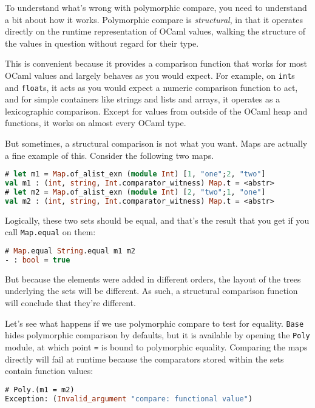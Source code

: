 To understand what's wrong with polymorphic compare, you need to
understand a bit about how it works. Polymorphic compare is
\emph{structural}, in that it operates directly on the runtime
representation of OCaml values, walking the structure of the values in
question without regard for their type.

This is convenient because it provides a comparison function that works
for most OCaml values and largely behaves as you would expect. For
example, on \passthrough{\lstinline!int!}s and
\passthrough{\lstinline!float!}s, it acts as you would expect a numeric
comparison function to act, and for simple containers like strings and
lists and arrays, it operates as a lexicographic comparison. Except for
values from outside of the OCaml heap and functions, it works on almost
every OCaml type.

But sometimes, a structural comparison is not what you want. Maps are
actually a fine example of this. Consider the following two maps.

\begin{lstlisting}[language=Caml]
# let m1 = Map.of_alist_exn (module Int) [1, "one";2, "two"]
val m1 : (int, string, Int.comparator_witness) Map.t = <abstr>
# let m2 = Map.of_alist_exn (module Int) [2, "two";1, "one"]
val m2 : (int, string, Int.comparator_witness) Map.t = <abstr>
\end{lstlisting}

Logically, these two sets should be equal, and that's the result that
you get if you call \passthrough{\lstinline!Map.equal!} on them:

\begin{lstlisting}[language=Caml]
# Map.equal String.equal m1 m2
- : bool = true
\end{lstlisting}

But because the elements were added in different orders, the layout of
the trees underlying the sets will be different. As such, a structural
comparison function will conclude that they're different.

Let's see what happens if we use polymorphic compare to test for
equality. \passthrough{\lstinline!Base!} hides polymorphic comparison by
defaults, but it is available by opening the
\passthrough{\lstinline!Poly!} module, at which point
\passthrough{\lstinline!=!} is bound to polymorphic equality. Comparing
the maps directly will fail at runtime because the comparators stored
within the sets contain function values:

\begin{lstlisting}[language=Caml]
# Poly.(m1 = m2)
Exception: (Invalid_argument "compare: functional value")
\end{lstlisting}

